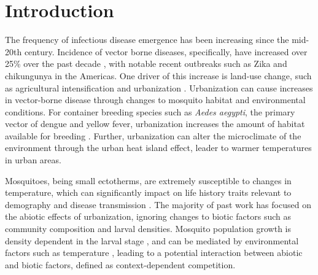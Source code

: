 \documentclass[12pt,]{article}
\begin{document}
\vskip 6.5pt

\newpage

\noindent \doublespacing \linenumbers \section{Introduction}\label{introduction}

The frequency of infectious disease emergence has been increasing since
the mid-20th century. Incidence of vector borne diseases, specifically,
have increased over 25\% over the past decade \citep{jones2008}, with
notable recent outbreaks such as Zika and chikungunya in the Americas.
One driver of this increase is land-use change, such as agricultural
intensification and urbanization \citep{gottdenker2014, jones2013}.
Urbanization can cause increases in vector-borne disease through changes
to mosquito habitat and environmental conditions. For container breeding
species such as \emph{Aedes aegypti}, the primary vector of dengue and
yellow fever, urbanization increases the amount of habitat available for
breeding \citep{zahouli2017, li2014}. Further, urbanization can alter
the microclimate of the environment through the urban heat island
effect, leader to warmer temperatures in urban areas\citep{peng2012}.

Mosquitoes, being small ectotherms, are extremely susceptible to changes
in temperature, which can significantly impact on life history traits
relevant to demography and disease transmission
\citep{murdock2017, paaijmans2009}. The majority of past work has
focused on the abiotic effects of urbanization, ignoring changes to
biotic factors such as community composition and larval densities.
Mosquito population growth is density dependent in the larval stage
\citep{juliano1998, reiskind2009a}, and can be mediated by environmental
factors such as temperature \citep{costanzo2005, lounibos2002a} ,
leading to a potential interaction between abiotic and biotic factors,
defined as context-dependent competition.
\end{document}
